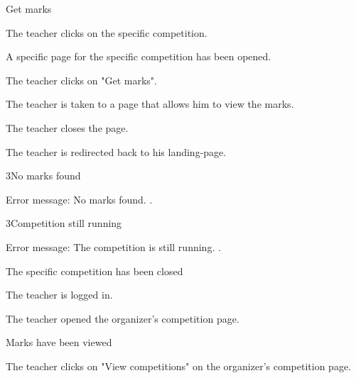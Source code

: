 \begin{uc}{Get marks}

    \begin{uc-mss}
    \item The teacher clicks on the specific competition.
    \item A specific page for the specific competition has been opened.
    \item The teacher clicks on "Get marks".
    \item The teacher is taken to a page that allows him to view the marks.
    \item The teacher closes the page.
    \item The teacher is redirected back to his landing-page.
    \end{uc-mss}

    \begin{uc-ext}

        \begin{uc-fail}{3}{No marks found}
        \item Error message: No marks found.
            .
        \end{uc-fail}

        \begin{uc-fail}{3}{Competition still running}
        \item Error message: The competition is still running.
            .
        \end{uc-fail}

    \end{uc-ext}

    \begin{uc-pre}
    \item The specific competition has been closed
        \item The teacher is logged in.
        \item The teacher opened the organizer's competition page.
    \end{uc-pre}

    \begin{uc-post}
    \item Marks have been viewed
    \end{uc-post}

    \begin{uc-trig}
        The teacher clicks on "View competitions" on the organizer's competition page.
    \end{uc-trig}

\end{uc}
